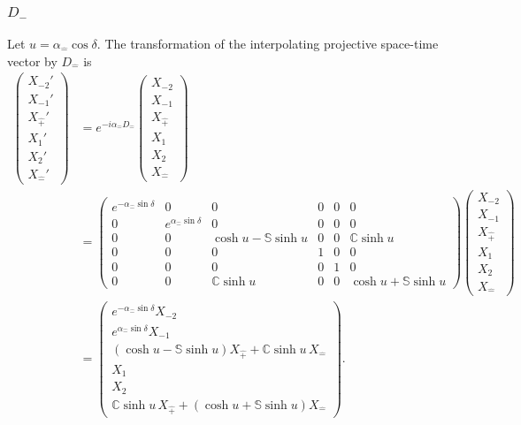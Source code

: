 \documentclass[foundations,article,submit,pdftex,moreauthors]{Definitions/mdpi}
\begin{document}
\subsubsection{\texorpdfstring{$D_{\hat{-}}$}{D hat minus}}

Let $u=\alpha_{\hat{-}}\cos\delta$. The transformation of the interpolating projective
space-time vector by $D_{\hat{-}}$ is
\begin{align}
\begin{pmatrix}
X_{-2}'\\ X_{-1}'\\ X_{\hat{+}}'\\ X_1'\\ X_2'\\ X_{\hat{-}}'
\end{pmatrix}
&=e^{-i\alpha_{\hat{-}}D_{\hat{-}}}
\begin{pmatrix}
X_{-2}\\ X_{-1}\\ X_{\hat{+}}\\ X_1\\ X_2\\ X_{\hat{-}}
\end{pmatrix}\\
&=\begin{pmatrix}
e^{-\alpha_{\hat{-}}\sin\delta} & 0 & 0 & 0 & 0 & 0\\
0 & e^{\alpha_{\hat{-}}\sin\delta} & 0 & 0 & 0 & 0\\
0 & 0 & \cosh u-\mathbb{S}\sinh u & 0 & 0 & \mathbb{C}\sinh u\\
0 & 0 & 0 & 1 & 0 & 0\\
0 & 0 & 0 & 0 & 1 & 0\\
0 & 0 & \mathbb{C}\sinh u & 0 & 0 & \cosh u+\mathbb{S}\sinh u
\end{pmatrix}
\begin{pmatrix}
X_{-2}\\ X_{-1}\\ X_{\hat{+}}\\ X_1\\ X_2\\ X_{\hat{-}}
\end{pmatrix}\\
&=\begin{pmatrix}
e^{-\alpha_{\hat{-}}\sin\delta}X_{-2}\\
e^{\alpha_{\hat{-}}\sin\delta}X_{-1}\\
\left(\cosh u-\mathbb{S}\sinh u\right)X_{\hat{+}}
 +\mathbb{C}\sinh u\,X_{\hat{-}}\\
X_1\\ X_2\\
\mathbb{C}\sinh u\,X_{\hat{+}}
 +\left(\cosh u+\mathbb{S}\sinh u\right)X_{\hat{-}}
\end{pmatrix}.
\end{align}
\end{document}
